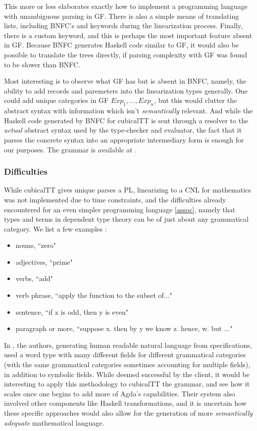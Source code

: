 This more or less elaborates exactly how to implement a programming language
with unambiguous parsing in GF. There is also a simple means of translating
lists, including BNFC's  and  keywords during
the linearization process. Finally, there is a custom  keyword, and
this is perhaps the most important feature absent in GF. Because BNFC generates
Haskell code similar to GF, it would also be possible to translate the trees
directly, if parsing complexity with GF was found to be slower than BNFC.

Most interesting is to observe what GF has but is absent in BNFC, namely, the
ability to add records and paremeters into the linearization types generally.
One could add unique categories in GF $Exp_1,...,Exp_n$, but this would clutter
the abstract syntax with information which isn't \emph{semantically} relevant.
And while the Haskell code generated by BNFC for cubicalTT is sent through a
resolver to the \emph{actual} abstract syntax used by the type-checker and
evaluator, the fact that it parses the concrete syntax into an appropriate
intermediary form is enough for our purposes. The grammar is available at
\cite{warrickCub}.

\subsubsection{Difficulties}

While cubicalTT gives unique parses a PL, linearizing to a CNL for mathematics was not implemented due to
time constraints, and the difficulties already encountered for an even simpler
programming language \ref{assoc}, namely that types and terms in dependent type
theory can be of just about any grammatical category. We list a few examples :

\begin{itemize}
\item nouns, ``zero"
\item adjectives, ``prime"
\item verbs, ``add"
\item verb phrase, ``apply the function to the subset of..."
\item sentence, ``if x is odd, then y is even"
\item paragraph or more, ``suppose x. then by y we know z. hence, w. but ..."
\end{itemize}

In \cite{rantaZ}, the authors, generating human readable natural language from
specifications, used a word type with many different fields for different
grammatical categories (with the same grammatical categories sometimes
accounting for multiple fields), in addition to symbolic fields. While deemed
successful by the client, it would be interesting to apply this methodology to
cubicalTT the grammar, and see how it scales once one begins to add more of
Agda's capabilities. Their system also involved other components like Haskell
transformations, and it is uncertain how these specific approaches would also
allow for the generation of more \emph{semantically adequate} mathematical
language.

